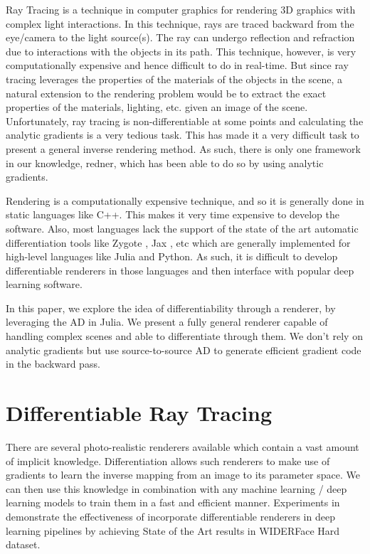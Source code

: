 \documentclass{juliacon}
\begin{document}
Ray Tracing is a technique in computer graphics for rendering 3D graphics with complex light interactions. In this technique, rays are traced backward from the eye/camera to the light source(s). The ray can undergo reflection and refraction due to interactions with the objects in its path. This technique, however, is very computationally expensive and hence difficult to do in real-time. But since ray tracing leverages the properties of the materials of the objects in the scene, a natural extension to the rendering problem would be to extract the exact properties of the materials, lighting, etc. given an image of the scene. Unfortunately, ray tracing is non-differentiable at some points and calculating the analytic gradients is a very tedious task. This has made it a very difficult task to present a general inverse rendering method. As such, there is only one framework in our knowledge, redner\cite{Li:2018:DMC}, which has been able to do so by using analytic gradients.

Rendering is a computationally expensive technique, and so it is generally done in static languages like C++. This makes it very time expensive to develop the software. Also, most languages lack the support of the state of the art automatic differentiation tools like Zygote \cite{DBLP:journals/corr/abs-1810-07951}, Jax \cite{jax}, etc which are generally implemented for high-level languages like Julia and Python. As such, it is difficult to develop differentiable renderers in those languages and then interface with popular deep learning software.

In this paper, we explore the idea of differentiability through a renderer, by leveraging the AD in Julia\cite{bezanson2017julia}. We present a fully general renderer capable of handling complex scenes and able to differentiate through them. We don't rely on analytic gradients but use source-to-source AD to generate efficient gradient code in the backward pass.

\section{Differentiable Ray Tracing}

There are several photo-realistic renderers available which contain a vast amount of implicit knowledge. Differentiation allows such renderers to make use of gradients to learn the inverse mapping from an image to its parameter space. We can then use this knowledge in combination with any machine learning / deep learning models to train them in a fast and efficient manner. Experiments in \cite{retinaface} demonstrate the effectiveness of incorporate differentiable renderers in deep learning pipelines by achieving State of the Art results in WIDERFace Hard dataset.
\end{document}
